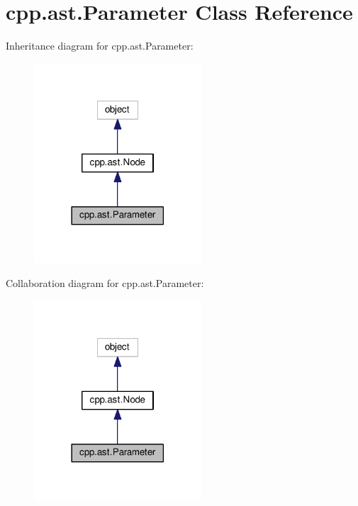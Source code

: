 \hypertarget{classcpp_1_1ast_1_1Parameter}{}\section{cpp.\+ast.\+Parameter Class Reference}
\label{classcpp_1_1ast_1_1Parameter}


Inheritance diagram for cpp.\+ast.\+Parameter\+:\nopagebreak
\begin{figure}[H]
\begin{center}
\leavevmode
\includegraphics[width=177pt]{classcpp_1_1ast_1_1Parameter__inherit__graph}
\end{center}
\end{figure}


Collaboration diagram for cpp.\+ast.\+Parameter\+:\nopagebreak
\begin{figure}[H]
\begin{center}
\leavevmode
\includegraphics[width=177pt]{classcpp_1_1ast_1_1Parameter__coll__graph}
\end{center}
\end{figure}
